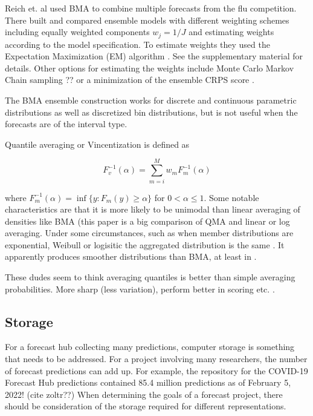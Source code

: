 \documentclass{article}\usepackage[]{graphicx}\usepackage[]{color}
\begin{document}
Reich et. al used BMA to combine multiple forecasts from the flu 
competition. There built and compared ensemble models with different weighting
schemes including equally weighted components $w_j = 1/J$ and estimating weights
according to the model specification. To estimate weights they used the 
Expectation Maximization (EM) algorithm \cite{reich2019accuracy}. See the
supplementary material for details. Other options for estimating the weights 
include Monte Carlo Markov Chain sampling ??\cite{vrugt2008ensemble} or a 
minimization of the ensemble CRPS score \cite{baran2018combining}.

The BMA ensemble construction works for discrete and continuous parametric 
distributions as well as discretized bin distributions, but is not useful when 
the forecasts are of the interval type. 

Quantile averaging or Vincentization is defined as 

\begin{equation}
  F_v^{-1}(\alpha) = \sum_{m=i}^M w_m F_m^{-1} (\alpha)
\end{equation}

where $F_m^{-1} (\alpha) = \inf \{y:F_m(y) \geq \alpha\}$ for 
$0 < \alpha \leq 1$. Some notable characteristics are that it is more likely
to be unimodal than linear averaging of densities like BMA 
\cite{busetti2017quantile} (this paper is a big comparison of QMA and 
linear or log averaging. Under some circumstances, such as when member
distributions are exponential, Weibull or logisitic the aggregated distribution
is the same \cite{ratcliff1979group}. It apparently produces smoother
distributions than BMA, at least in \cite{schepen2015model}.

These dudes seem to think averaging quantiles is better than simple averaging 
probabilities. More sharp (less variation), perform better in scoring etc.
\cite{lichtendahl2013better}.


\subsection{Storage}
For a forecast hub collecting many predictions, computer storage is something
that needs to be addressed. For a project involving many researchers, the 
number of forecast predictions can add up. For example, the repository for the
COVID-19 Forecast Hub predictions contained 85.4 million predictions as of 
February 5, 2022! (cite zoltr??)
When determining the goals of a forecast project, there should be consideration 
of the storage required for different representations.
\end{document}
